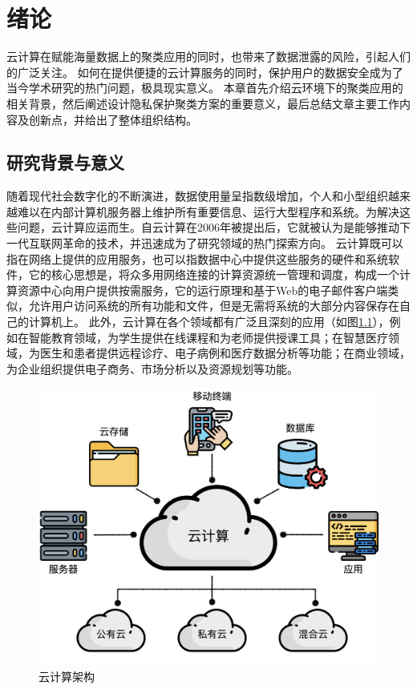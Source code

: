 \chapter{绪论}
云计算在赋能海量数据上的聚类应用的同时，也带来了数据泄露的风险，引起人们的广泛关注。
如何在提供便捷的云计算服务的同时，保护用户的数据安全成为了当今学术研究的热门问题，极具现实意义。
本章首先介绍云环境下的聚类应用的相关背景，然后阐述设计隐私保护聚类方案的重要意义，最后总结文章主要工作内容及创新点，并给出了整体组织结构。

\section{研究背景与意义}
随着现代社会数字化的不断演进，数据使用量呈指数级增加，个人和小型组织越来越难以在内部计算机服务器上维护所有重要信息、运行大型程序和系统。为解决这些问题，云计算应运而生。自云计算在2006年被提出后，它就被认为是能够推动下一代互联网革命的技术，并迅速成为了研究领域的热门探索方向\cite{sadiku2014cloud}。
云计算既可以指在网络上提供的应用服务，也可以指数据中心中提供这些服务的硬件和系统软件，它的核心思想是，将众多用网络连接的计算资源统一管理和调度，构成一个计算资源中心向用户提供按需服务，它的运行原理和基于Web的电子邮件客户端类似，允许用户访问系统的所有功能和文件，但是无需将系统的大部分内容保存在自己的计算机上。
此外，云计算在各个领域都有广泛且深刻的应用（如图\ref{img_cloud}），例如在智能教育领域，为学生提供在线课程和为老师提供授课工具；在智慧医疗领域，为医生和患者提供远程诊疗、电子病例和医疗数据分析等功能；在商业领域，为企业组织提供电子商务、市场分析以及资源规划等功能。

\begin{figure}[htbp]
	\centering
	\includegraphics[width=0.55\linewidth]{img/cloudarchi.png}
	\caption{云计算架构}
	\label{img_cloud}
\end{figure}

